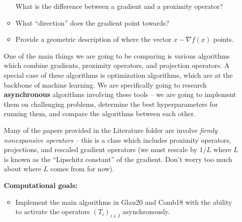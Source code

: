 \documentclass[a4paper,11pt,fleqn]{article}
\theoremstyle{plain}{\theorembodyfont{\rmfamily}%
\newtheorem{conjecture}[theorem]{Conjecture}}
\theoremstyle{plain}{\theorembodyfont{\rmfamily}%
\newtheorem{example}[theorem]{Example}}
\theoremstyle{plain}{\theorembodyfont{\rmfamily}%
\newtheorem{remark}[theorem]{Remark}}
\theoremstyle{plain}{\theorembodyfont{\rmfamily}%
\newtheorem{algorithm}[theorem]{Algorithm}}
\theoremstyle{plain}{\theorembodyfont{\rmfamily}%
\newtheorem{condition}[theorem]{Condition}}
\theoremstyle{plain}{\theorembodyfont{\rmfamily}%
\newtheorem{definition}[theorem]{Definition}}
\theoremstyle{plain}{\theorembodyfont{\rmfamily}
\newtheorem{fact}[theorem]{Fact}}
\theoremstyle{plain}{\theorembodyfont{\rmfamily}
\newtheorem{problem}[theorem]{Problem}}
\theoremstyle{plain}{\theorembodyfont{\rmfamily}
\newtheorem{notation}[theorem]{Notation}}
\theoremstyle{plain}{\theorembodyfont{\rmfamily}
\newtheorem{project}[theorem]{Project}}
\begin{document}
\begin{itemize}
\begin{itemize}
What is the difference between a gradient and a proximity operator?
\item
What ``direction'' does the gradient point towards?
\item
Provide a geometric description of where the vector $x - \nabla
f(x)$ points.
\end{itemize}
One of the main things we are going to be comparing is various
algorithms which combine gradients, proximity operators, and
projection operators. A special case of these algorithms is
optimization algorithms, which are at the backbone of machine
learning. We are specifically going to research
\textbf{asynchronous}
algorithms involving these tools -- we are going to implement them
on challenging problems, determine the best hyperparameters for
running them, and compare the algorithms between each other.

Many of the papers provided in the Literature folder are involve
{\em firmly nonexpansive operators} -- this is a class which
includes proximity operators, projections, and rescaled gradient
operators (we must rescale by $1/L$ where $L$ is known as the
``Lipschitz constant'' of the gradient. Don't worry too much about
where $L$ comes from for now).

\textbf{Computational goals:}
\begin{itemize}
\item
Implement the main algorithms in Glau20 and Comb18 with the ability
to activate the operators $(T_i)_{i\in I}$ asynchronously.
\end{itemize}
\end{itemize}
\end{document}
